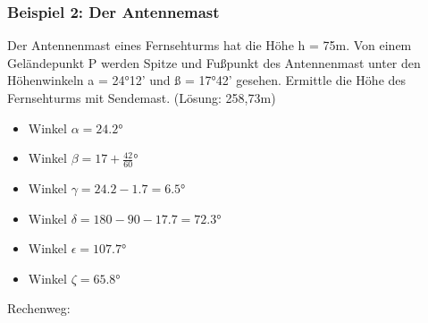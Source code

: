 \subsubsection{Beispiel 2: Der Antennemast}

\hfill \break
Der Antennenmast eines Fernsehturms hat die Höhe h = 75m. Von einem Geländepunkt P werden Spitze und Fußpunkt
des Antennenmast unter den Höhenwinkeln a = 24°12' und ß = 17°42' gesehen. Ermittle die Höhe des Fernsehturms
mit Sendemast.
(Lösung: 258,73m)

\hfill \break
\begin{itemize}
    \item Winkel $\alpha = 24.2$°
    \item Winkel $\beta = 17+\frac{42}{60}$°
    \item Winkel $\gamma = 24.2-1.7=6.5$°
    \item Winkel $\delta = 180 - 90 - 17.7 = 72.3$°
    \item Winkel $\epsilon = 107.7$°
    \item Winkel $\zeta = 65.8$°
\end{itemize}

\hfill \break
Rechenweg:\\
\fboxrule=0.8pt 

